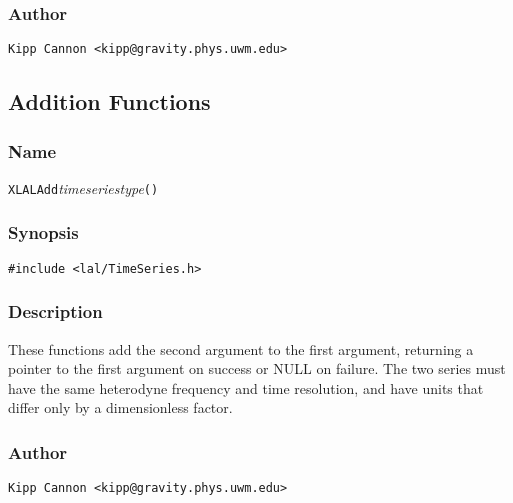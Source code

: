 \subsubsection{Author}

\verb|Kipp Cannon <kipp@gravity.phys.uwm.edu>|


\subsection{Addition Functions}

\subsubsection{Name}

\texttt{XLALAdd}\textit{timeseriestype}\texttt{()}

\subsubsection{Synopsis}

\begin{verbatim}
#include <lal/TimeSeries.h>
\end{verbatim}


\subsubsection{Description}

These functions add the second argument to the first argument, returning a
pointer to the first argument on success or NULL on failure.  The two
series must have the same heterodyne frequency and time resolution, and
have units that differ only by a dimensionless factor.

\subsubsection{Author}

\verb|Kipp Cannon <kipp@gravity.phys.uwm.edu>|


